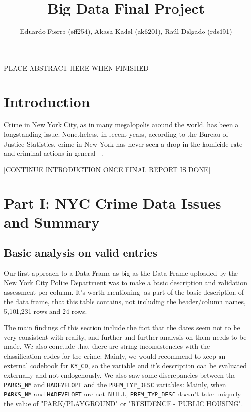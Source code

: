 \documentclass{article}
\title{Big Data Final Project}
\author {Eduardo Fierro (eff254), Akash Kadel (ak6201), Raúl Delgado (rds491)}
\begin{document}
\maketitle


\bigskip
\bigskip


\begin{center}
PLACE ABSTRACT HERE WHEN FINISHED
\end{center}

\pagebreak

\section{Introduction}

Crime in New York City, as in many megalopolis around the world, has been a longstanding issue. Nonetheless, in recent years, according to the Bureau of Justice Statistics, crime in New York has never seen a drop in the homicide rate and criminal actions in general ~\autocite{drop_in_Crime1}.  

[CONTINUE INTRODUCTION ONCE FINAL REPORT IS DONE]

\section{Part I: NYC Crime Data Issues and Summary}
\subsection{Basic analysis on valid entries}

Our first approach to a Data Frame as big as the Data Frame uploaded by the New York City Police Department was to make a basic description and validation assessment per column. It's worth mentioning, as part of the basic description of the data frame, that this table contains, not including the header/column names, 5,101,231 rows and 24 rows. 

The main findings of this section include the fact that the dates seem not to be very consistent with reality, and further and further analysis on them needs to be made. We also conclude that there are string inconsistencies with the classification codes for the crime: Mainly, we would recommend to keep an external codebook for \texttt{KY\_CD}, so the variable and it's description can be evaluated externally and not endogenously.  We also saw some discrepancies between the \texttt{PARKS\_NM} and  \texttt{HADEVELOPT} and the \texttt{PREM\_TYP\_DESC} variables: Mainly, when \texttt{PARKS\_NM} and  \texttt{HADEVELOPT} are not NULL, \texttt{PREM\_TYP\_DESC} doesn't take uniquely the value of "PARK/PLAYGROUND" or "RESIDENCE - PUBLIC HOUSING". 
\end{document}
